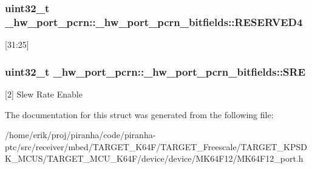 \subsubsection[{\texorpdfstring{R\+E\+S\+E\+R\+V\+E\+D4}{RESERVED4}}]{\setlength{\rightskip}{0pt plus 5cm}uint32\+\_\+t \+\_\+hw\+\_\+port\+\_\+pcrn\+::\+\_\+hw\+\_\+port\+\_\+pcrn\+\_\+bitfields\+::\+R\+E\+S\+E\+R\+V\+E\+D4}\hypertarget{struct__hw__port__pcrn_1_1__hw__port__pcrn__bitfields_a26ef496f3dca87b3adaa21cc432f6aa3}{}\label{struct__hw__port__pcrn_1_1__hw__port__pcrn__bitfields_a26ef496f3dca87b3adaa21cc432f6aa3}
\mbox{[}31\+:25\mbox{]} 
\subsubsection[{\texorpdfstring{S\+RE}{SRE}}]{\setlength{\rightskip}{0pt plus 5cm}uint32\+\_\+t \+\_\+hw\+\_\+port\+\_\+pcrn\+::\+\_\+hw\+\_\+port\+\_\+pcrn\+\_\+bitfields\+::\+S\+RE}\hypertarget{struct__hw__port__pcrn_1_1__hw__port__pcrn__bitfields_a6c28e0f766aa718d138b21ed849749c7}{}\label{struct__hw__port__pcrn_1_1__hw__port__pcrn__bitfields_a6c28e0f766aa718d138b21ed849749c7}
\mbox{[}2\mbox{]} Slew Rate Enable 

The documentation for this struct was generated from the following file\+:\begin{DoxyCompactItemize}
\item 
/home/erik/proj/piranha/code/piranha-\/ptc/src/receiver/mbed/\+T\+A\+R\+G\+E\+T\+\_\+\+K64\+F/\+T\+A\+R\+G\+E\+T\+\_\+\+Freescale/\+T\+A\+R\+G\+E\+T\+\_\+\+K\+P\+S\+D\+K\+\_\+\+M\+C\+U\+S/\+T\+A\+R\+G\+E\+T\+\_\+\+M\+C\+U\+\_\+\+K64\+F/device/device/\+M\+K64\+F12/M\+K64\+F12\+\_\+port.\+h\end{DoxyCompactItemize}
